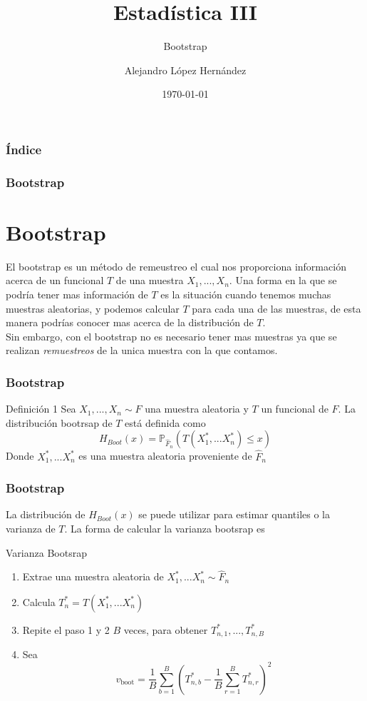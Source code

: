 \documentclass[aspectratio=169,spanish]{beamer}
\title{Estadística III}
\subtitle{Bootstrap}
\author{Alejandro López Hernández}
\institute{FES Acatlán - UNAM}
\date{\today}
\begin{document}
\frame{\titlepage}



\begin{frame}
\frametitle{Índice}
\tableofcontents
\end{frame}

\begin{frame}
\frametitle{Bootstrap}
\section{Bootstrap}
El bootstrap es un método de remeustreo el cual nos proporciona información acerca de un funcional $T$ de una muestra $X_1,...,X_n$. Una forma en la que se podría tener mas información de $T$ es la situación cuando tenemos muchas muestras aleatorias, y podemos calcular $T$ para cada una de las muestras, de esta manera podrías conocer mas acerca de la distribución de $T$.
\\
Sin embargo, con el bootstrap no es necesario tener mas muestras ya que se realizan \textit{remuestreos} de la unica muestra con la que contamos. 
\end{frame}


\begin{frame}
\frametitle{Bootstrap}
\begin{block}{Definición 1}
Sea $X_1,...,X_n\sim F$ una muestra aleatoria y $T$ un funcional de $F$. La distribución bootrsap de $T$ está definida como 
$$H_{{Boot}}(x) = \mathbb{P}_{\hat{F}_n}(T(X_1^{*},...X_n^{*})\le x)$$
Donde $X_1^{*},...X_n^{*}$ es una muestra aleatoria proveniente de $\hat{F}_n$
\end{block}
\end{frame}

\begin{frame}
\frametitle{Bootstrap}
La distribución de $H_{{Boot}}(x)$ se puede utilizar para estimar quantiles o la varianza de $T$. La forma de calcular la varianza bootsrap es
\begin{block}{Varianza Bootsrap}
\begin{enumerate}
\item Extrae una muestra aleatoria de $X_1^{*},...X_n^{*}\sim\hat{F}_n$
\item Calcula $T_n^{*} = T(X_1^{*},...X_n^{*})$
\item Repite el paso 1 y 2 $B$ veces, para obtener $T_{n,1}^{*},...,T_{n,B}^{*}$
\item Sea $$v_{\text{boot}}=\frac{1}{B}\sum_{b=1}^{B}\left(T_{n,b}^{*}-\frac{1}{B}\sum_{r=1}^{B}T_{n,r}^{*}\right)^2$$
\end{enumerate}
\end{block}
\end{frame}
\end{document}
